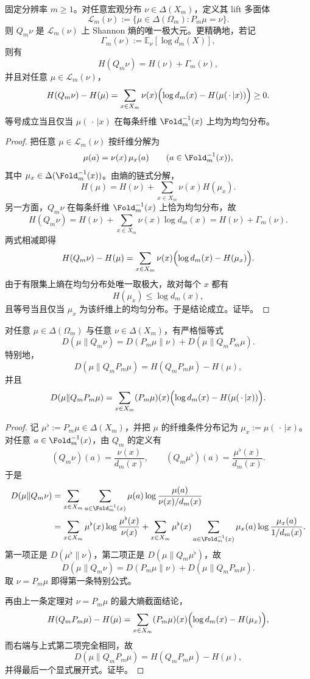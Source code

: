 \begin{theorem}[纤维均匀提升是唯一的最大熵截面]\label{thm:conclusion-fold-audit-maxent-section-uniqueness}
固定分辨率 \(m\ge 1\)。对任意宏观分布 \(\nu\in\Delta(X_m)\)，定义其 lift 多面体
\[
\mathcal L_m(\nu):=
\{\mu\in\Delta(\Omega_m):P_m\mu=\nu\}.
\]
则 \(Q_m\nu\) 是 \(\mathcal L_m(\nu)\) 上 Shannon 熵的唯一极大元。更精确地，若记
\[
\Gamma_m(\nu):=\mathbb E_\nu[\log d_m(X)],
\]
则有
\[
H(Q_m\nu)=H(\nu)+\Gamma_m(\nu),
\]
并且对任意 \(\mu\in\mathcal L_m(\nu)\)，
\[
H(Q_m\nu)-H(\mu)
=
\sum_{x\in X_m}\nu(x)\Bigl(\log d_m(x)-H(\mu(\,\cdot\,|x))\Bigr)\ge 0.
\]
等号成立当且仅当 \(\mu(\,\cdot\,|x)\) 在每条纤维 \(\Fold_m^{-1}(x)\) 上均为均匀分布。
\end{theorem}
\begin{proof}
把任意 \(\mu\in\mathcal L_m(\nu)\) 按纤维分解为
\[
\mu(a)=\nu(x)\,\mu_x(a)\qquad (a\in \Fold_m^{-1}(x)),
\]
其中 \(\mu_x\in\Delta(\Fold_m^{-1}(x))\)。由熵的链式分解，
\[
H(\mu)=H(\nu)+\sum_{x\in X_m}\nu(x)H(\mu_x).
\]
另一方面，\(Q_m\nu\) 在每条纤维 \(\Fold_m^{-1}(x)\) 上恰为均匀分布，故
\[
H(Q_m\nu)
=
H(\nu)+\sum_{x\in X_m}\nu(x)\log d_m(x)
=
H(\nu)+\Gamma_m(\nu).
\]
两式相减即得
\[
H(Q_m\nu)-H(\mu)
=
\sum_{x\in X_m}\nu(x)\Bigl(\log d_m(x)-H(\mu_x)\Bigr).
\]
由于有限集上熵在均匀分布处唯一取极大，故对每个 \(x\) 都有
\[
H(\mu_x)\le \log d_m(x),
\]
且等号当且仅当 \(\mu_x\) 为该纤维上的均匀分布。于是结论成立。证毕。
\end{proof}

\begin{theorem}\label{thm:conclusion-fold-audit-kl-pythagoras}
对任意 \(\mu\in\Delta(\Omega_m)\) 与任意 \(\nu\in\Delta(X_m)\)，有严格恒等式
\[
D(\mu\|Q_m\nu)
=
D(P_m\mu\|\nu)+D(\mu\|Q_mP_m\mu).
\]
特别地，
\[
D(\mu\|Q_mP_m\mu)=H(Q_mP_m\mu)-H(\mu),
\]
并且
\[
D(\mu\|Q_mP_m\mu)
=
\sum_{x\in X_m}(P_m\mu)(x)\Bigl(\log d_m(x)-H(\mu(\,\cdot\,|x))\Bigr).
\]
\end{theorem}
\begin{proof}
记 \(\mu^\flat:=P_m\mu\in\Delta(X_m)\)，并把 \(\mu\) 的纤维条件分布记为 \(\mu_x:=\mu(\,\cdot\,|x)\)。对任意 \(a\in\Fold_m^{-1}(x)\)，由 \(Q_m\) 的定义有
\[
(Q_m\nu)(a)=\frac{\nu(x)}{d_m(x)},
\qquad
(Q_m\mu^\flat)(a)=\frac{\mu^\flat(x)}{d_m(x)}.
\]
于是
\[
\begin{aligned}
D(\mu\|Q_m\nu)
&=
\sum_{x\in X_m}\sum_{a\in\Fold_m^{-1}(x)}
\mu(a)\log\frac{\mu(a)}{\nu(x)/d_m(x)}\\
&=
\sum_{x\in X_m}\mu^\flat(x)\log\frac{\mu^\flat(x)}{\nu(x)}
+\sum_{x\in X_m}\mu^\flat(x)
\sum_{a\in\Fold_m^{-1}(x)}\mu_x(a)\log\frac{\mu_x(a)}{1/d_m(x)}.
\end{aligned}
\]
第一项正是 \(D(\mu^\flat\|\nu)\)，第二项正是 \(D(\mu\|Q_m\mu^\flat)\)，故
\[
D(\mu\|Q_m\nu)=D(P_m\mu\|\nu)+D(\mu\|Q_mP_m\mu).
\]
取 \(\nu=P_m\mu\) 即得第一条特别公式。

再由上一条定理对 \(\nu=P_m\mu\) 的最大熵截面结论，
\[
H(Q_mP_m\mu)-H(\mu)
=
\sum_{x\in X_m}(P_m\mu)(x)\Bigl(\log d_m(x)-H(\mu_x)\Bigr),
\]
而右端与上式第二项完全相同，故
\[
D(\mu\|Q_mP_m\mu)=H(Q_mP_m\mu)-H(\mu),
\]
并得最后一个显式展开式。证毕。
\end{proof}


